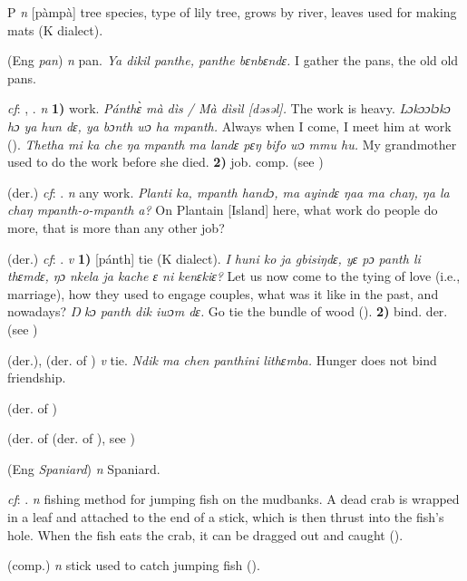 \begin{letter}{P}
 \textit{n} [pàmpà] tree species, type of lily tree, grows by river, leaves used for making mats (K dialect). 

 (Eng \textit{pan}) \textit{n} pan. \textit{Ya dikil panthe, panthe bɛnbɛndɛ.} I gather the pans, the old old pans.

 \textit{cf}: , . \textit{n} \textbf{1)} work. \textit{Pánthɛ̀ mà dìs / Mà dìsìl [dəsəl].} The work is heavy. \textit{Lɔkɔɔlɔkɔ hɔ ya hun dɛ, ya bɔnth wɔ ha mpanth.} Always when I come, I meet him at work (\citealt{Pichl1967}). \textit{Thetha mi ka che ŋa mpanth ma landɛ pɛŋ bifo wɔ mmu hu.} My grandmother used to do the work before she died. \textbf{2)} job. comp.  (see )

 (der.) \textit{cf}: . \textit{n} any work. \textit{Planti ka, mpanth handɔ, ma ayindɛ ŋaa ma chaŋ, ŋa la chaŋ mpanth-o-mpanth a?} On Plantain [Island] here, what work do people do more, that is more than any other job? 

 (der.) \textit{cf}: . \textit{v} \textbf{1)} [pánth] tie (K dialect). \textit{I huni ko ja gbisiŋdɛ, yɛ pɔ panth li thɛmdɛ, ŋɔ nkela ja kache ɛ ni kenɛkiɛ?} Let us now come to the tying of love (i.e., marriage), how they used to engage couples, what was it like in the past, and nowadays? \textit{Ŋ kɔ panth dik iwɔm dɛ.} Go tie the bundle of wood (\citealt{Pichl1967}). \textbf{2)} bind. der.  (see )

 (der.), (der. of ) \textit{v} tie. \textit{Ndik ma chen panthini lithɛmba.} Hunger does not bind friendship.

 (der. of )

 (der. of  (der. of ), see ) 

 (Eng \textit{Spaniard}) \textit{n} Spaniard.

 \textit{cf}: . \textit{n} fishing method for jumping fish on the mudbanks. A dead crab is wrapped in a leaf and attached to the end of a stick, which is then thrust into the fish's hole. When the fish eats the crab, it can be dragged out and caught (\citealt{Pichl1967}). 

 (comp.) \textit{n} stick used to catch jumping fish (\citealt{Pichl1967}). 


\end{letter}
